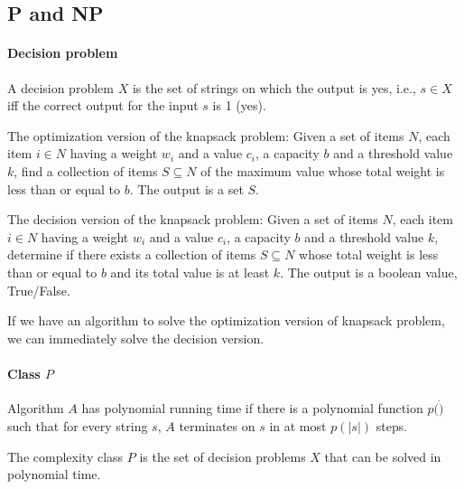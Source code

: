             \subsection{P and NP}
                \paragraph{Decision problem} A decision problem $X$ is the set of strings on which the output is yes, i.e., $s \in X$ iff the correct output for the input $s$ is 1 (yes).

                    \begin{example}
                        The optimization version of the knapsack problem: Given a set of items $N$, each item $i \in N$ having a weight $w_i$ and a value $c_i$, a capacity $b$ and a threshold value $k$, find a collection of items $S \subseteq N$ of the maximum value whose total weight is less than or equal to $b$. The output is a set $S$.

                        The decision version of the knapsack problem: Given a set of items $N$, each item $i \in N$ having a weight $w_i$ and a value $c_i$, a capacity $b$ and a threshold value $k$, determine if there exists a collection of items $S \subseteq N$ whose total weight is less than or equal to $b$ and its total value is at least $k$. The output is a boolean value, True/False.
                    \end{example}

                    If we have an algorithm to solve the optimization version of knapsack problem, we can immediately solve the decision version. 

                \paragraph{Class $P$}
                    \begin{definition}
                        Algorithm $A$ has polynomial running time if there is a polynomial function $p(\dot)$ such that for every string $s$, $A$ terminates on $s$ in at most $p(|s|)$ steps.
                    \end{definition}

                    \begin{definition}[Class $P$]
                        The complexity class $P$ is the set of decision problems $X$ that can be solved in polynomial time.
                    \end{definition}

